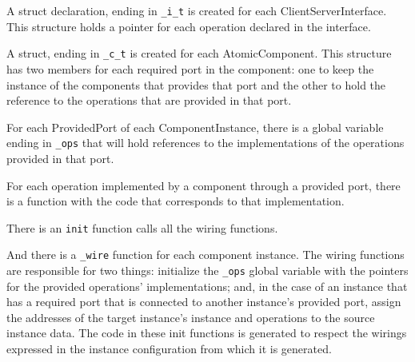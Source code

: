 \begin{compactitem}

\item A struct declaration, ending in \verb=_i_t= is created for each
ClientServerInterface. This structure holds a pointer for each operation
declared in the interface.

\item A struct, ending in \verb=_c_t= is created for each AtomicComponent. This
structure has two members for each required port in the component: one to keep
the instance of the components that provides that port and the other to hold the
reference to the operations that are provided in that port.

\item For each ProvidedPort of each ComponentInstance, there is a global
variable ending in \verb=_ops= that will hold references to the implementations
of the operations provided in that port.

\item For each operation implemented by a component through a provided port,
there is a function with the code that corresponds to that
implementation.

\item There is an \verb=init= function calls all the wiring functions.

\item And there is a \verb=_wire= function for each component instance. The
wiring functions are responsible for two things: initialize the \verb=_ops=
global variable with the pointers for the provided operations' implementations;
and, in the case of an instance that has a required port that is connected to
another instance's provided port, assign the addresses of the target instance's
instance and operations to the source instance data. The code in these init
functions is generated to respect the wirings expressed in the instance
configuration from which it is generated.

\end{compactitem}

